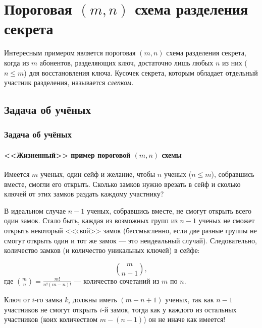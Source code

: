

\section{Пороговая $(m,n)$ схема разделения секрета}


Интересным примером является пороговая $(m,n)$ схема разделения секрета, когда из $m$ абонентов, разделяющих ключ, достаточно лишь любых $n$ из них ($n\leq m$) для восстановления ключа. Кусочек секрета, которым обладает отдельный участник разделения, называется \emph{слепком}.


\subsection{Задача об учёных}


\begin{frame}
    \frametitle{Задача об учёных}
    \framesubtitle{<<Жизненный>> пример пороговой $(m,n)$ схемы}
    
    \begin{example}
        Имеется $m$ ученых, один сейф и желание, чтобы $n$ ученых ($n\leq m$), собравшись вместе, смогли его открыть.
        Сколько замков нужно врезать в сейф и сколько ключей от этих замков раздать каждому участнику? 
    \end{example}
    
     {
    }
\end{frame}


В идеальном случае $n-1$ ученых, собравшись вместе, не смогут открыть всего один замок. Стало быть, каждая из возможных групп из $n-1$ ученых не сможет открыть некоторый <<свой>> замок (бессмысленно, если две разные группы не смогут открыть один и тот же замок --- это неидеальный случай). Следовательно, количество замков (и количество уникальных ключей) в сейфе:

\[ \binom{m}{n-1}, \]
где $\binom{m}{n}=\frac{m!}{n!(m-n)!}$ --- количество сочетаний из $m$ по $n$.

Ключ от $i$-го замка $k_i$ должны иметь $(m-n+1)$ ученых, так как $n-1$ участников не смогут открыть $i$-й замок, тогда как у каждого из остальных участников (коих количеством $m-(n-1)$) он не иначе как имеется!


